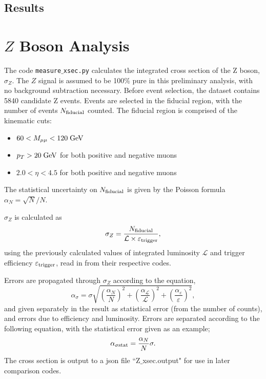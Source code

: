 \documentclass[a4paper,12pt]{article}
\begin{document}
\subsection{Results}




\section{$Z$ Boson Analysis} \label{sec: Z analysis}

The code \texttt{measure$\_$xsec.py} calculates the integrated cross section of the Z boson, $\sigma_Z$. The $Z$ signal is assumed to be 100$\%$ pure in this preliminary analysis, with no background subtraction necessary.
Before event selection, the dataset contains 5840 candidate Z events.
Events are selected in the fiducial region, with the number of events $N_{\rm fiducial}$ counted. The fiducial region is comprised of the kinematic cuts:

\begin{itemize}
  \item $60 < M_{\mu\mu} < 120 \; {\rm GeV}$ 
  \item $p_T > 20 \; {\rm GeV}$ for both positive and negative muons
  \item $2.0 < \eta < 4.5$ for both positive and negative muons
\end{itemize}
The statistical uncertainty on $N_{\rm fiducial}$ is given by the Poisson formula $\alpha_N = \sqrt{N}/N$.

$\sigma_Z$ is calculated as
\begin{equation}
\sigma_Z = \frac{N_{\rm fiducial}}{\mathcal{L} \times {\varepsilon_{\rm trigger}}},
\label{eq: Z_xsec}
\end{equation}
using the previously calculated values of integrated luminosity $\mathcal{L}$ and trigger efficiency $\varepsilon_{\rm trigger}$, read in from their respective codes.

Errors are propagated through $\sigma_Z$ according to the equation,
\begin{equation}
    \alpha_\sigma = \sigma \sqrt{\left(\frac{\alpha_N}{N}\right)^2 + \left(\frac{\alpha_\mathcal{L}}{\mathcal{L}}\right)^2 + \left(\frac{\alpha_\varepsilon}{\varepsilon}\right)^2},
    \label{eq: xsec error}
\end{equation}
and given separately in the result as statistical error (from the number of counts), and errors due to efficiency and luminosity. Errors are separated according to the following equation, with the statistical error given as an example;
\begin{equation}
    \alpha_{\sigma {\rm stat}} = \frac{\alpha_N}{N}\sigma.
    \label{eq: xsec error separation}
\end{equation}
The cross section is output to a json file ``Z$\_$xsec.output" for use in later comparison codes.
\end{document}
